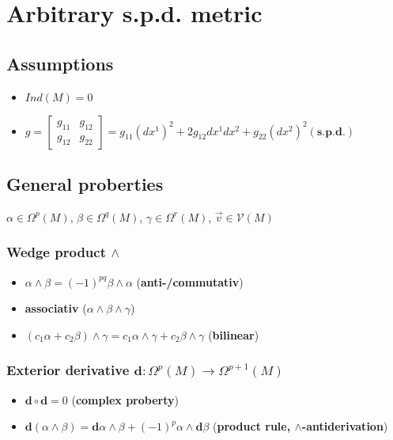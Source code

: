 \documentclass{scrartcl}
\newcommand{\exd}{\mathbf{d}}
\begin{document}
  \section{Arbitrary s.p.d. metric}
    \subsection{Assumptions}
      \begin{itemize}
        \item \( Ind(M) = 0 \)
        \item \( g =
      \begin{bmatrix}
        g_{11} & g_{12} \\
        g_{12} & g_{22}
      \end{bmatrix}  = g_{11}\left( dx^{1} \right)^{2} + 2g_{12}dx^{1}dx^{2} + g_{22}\left( dx^{2} \right)^{2}
        (\textbf{s.p.d.}) \)
      \end{itemize}

    \subsection{General proberties}
      \( \alpha \in \Omega^{p}(M) \),  \( \beta \in \Omega^{q}(M) \),  \( \gamma \in \Omega^{r}(M) \),
      \( \vec{v} \in \mathcal{V}(M) \)
      \subsubsection{Wedge product \( \wedge \)}
      \begin{itemize}
        \item \( \alpha\wedge\beta = (-1)^{pq}\beta\wedge\alpha \)
            (\textbf{anti-/commutativ})
        \item \textbf{associativ} (\( \alpha\wedge\beta\wedge\gamma \))
        \item \( \left( c_{1}\alpha + c_{2}\beta \right)\wedge\gamma
                  = c_{1}\alpha\wedge\gamma + c_{2}\beta\wedge\gamma\)
              (\textbf{bilinear})
      \end{itemize}

      \subsubsection{Exterior derivative \( \exd:\Omega^{p}(M)\rightarrow\Omega^{p+1}(M) \)}
        \begin{itemize}
          \item \( \exd\circ\exd = 0 \) (\textbf{complex proberty})
          \item \( \exd\left( \alpha \wedge \beta \right) = \exd\alpha\wedge\beta + (-1)^{p}\alpha\wedge\exd\beta \)
                (\textbf{product rule, \( \wedge \)-antiderivation})
        \end{itemize}
\end{document}
